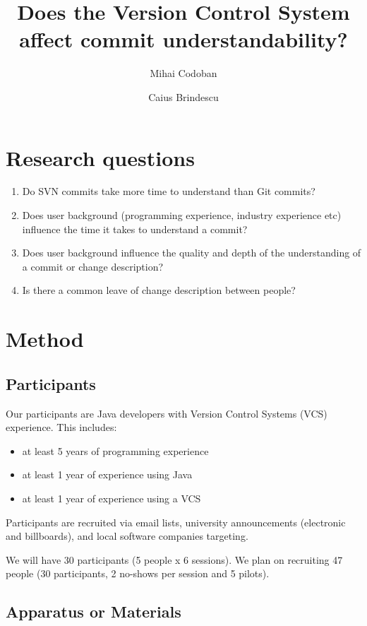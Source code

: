 \documentclass[letterpaper]{article}
\title{Does the Version Control System affect commit understandability?}
\author{Mihai Codoban \and Caius Brindescu}
\date{}
\begin{document}
\maketitle

\section{Research questions}

\begin{enumerate}
	\item Do SVN commits take more time to understand than Git commits?
	\item Does user background (programming experience, industry experience etc) influence the time it takes to understand a commit?
	\item Does user background influence the quality and depth of the understanding of a commit or change description?
	\item Is there a common leave of change description between people?
\end{enumerate}

\section{Method}

\subsection{Participants}

Our participants are Java developers with Version Control Systems (VCS) experience. 
This includes:
\begin{itemize}
	\item at least 5 years of programming experience
	\item at least 1 year of experience using Java
	\item at least 1 year of experience using a VCS
\end{itemize}

Participants are recruited via email lists, university announcements (electronic and billboards), and local software companies targeting.

We will have 30 participants (5 people x 6 sessions). 
We plan on recruiting 47 people (30 participants, 2 no-shows per session and 5 pilots).

\subsection{Apparatus or Materials}
\label{apparatus}
\end{document}
